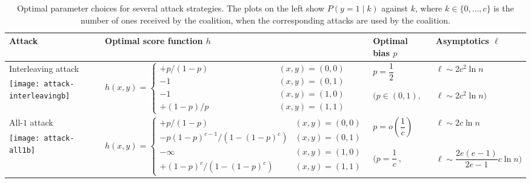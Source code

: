 \documentclass[10pt,a4paper,twocolumn]{article}
\begin{document}
\begin{table*}[t]
\centering

    \caption{Optimal parameter choices for several attack strategies. The plots on the left show $P(y = 1 \mid k)$ against $k$, where $k \in \{0, \dots, c\}$ is the number of ones received by the coalition, when the corresponding attacks are used by the coalition.}
    \label{tab:1}
\renewcommand{\arraystretch}{1.3}\begin{small}
    \begin{tabular}{p{2.8cm}p{8.2cm}p{2.2cm}p{3cm}}
    \toprule
    {\bfseries Attack} & {\bfseries Optimal score function $h$} & {\bfseries Optimal bias $p$} & {\bfseries Asymptotics $\ell$} \\ 
    \midrule
    Interleaving attack & \multirow{4}{*}{$h(x,y) = \begin{cases} 
	+p/(1 - p) \qquad \qquad \qquad \quad \	\	& (x,y) = (0,0) \\
	-1 											& (x,y) = (0,1) \\
	-1 											& (x,y) = (1,0) \\ 
	+(1 - p)/p									& (x,y) = (1,1) 
	\end{cases}$} & \multirow{2}{*}{$p = \dfrac{1}{2}$}  & \multirow{2}{*}{$\ell \sim 2 c^2 \ln n$} \\
    \multirow{3}{*}{\texttt{[image: attack-interleavingb]}}	& &	& \\
            & &	\multirow{2}{*}{$\Big(p \in (0,1),$} & \multirow{2}{*}{$\ell \sim 2 c^2 \ln n\Big)$} \\
            & & & \\
    \midrule
	All-$1$ attack & \multirow{4}{*}{$h(x,y) = \begin{cases} 
	+p/(1 - p) 									& (x,y) = (0,0) \\
	-p(1 - p)^{c - 1}/(1 - (1 - p)^c) 			& (x,y) = (0,1) \\
	-\infty 									& (x,y) = (1,0) \\ 
	+(1 - p)^c/(1 - (1 - p)^c)					& (x,y) = (1,1) 
	\end{cases}$} & \multirow{2}{*}{$p = o\left(\dfrac{1}{c}\right)$} & \multirow{2}{*}{$\ell \sim 2 c \ln n$} \\
	\multirow{3}{*}{\texttt{[image: attack-all1b]}}			& & & \\
& & \multirow{2}{*}{$\Big(p = \dfrac{1}{c}\, ,$} & \multirow{2}{*}{$\ell \sim \dfrac{2e(e-1)}{2e-1} c \ln n\Big)$} \\
			& & & \\

\end{tabular}
\end{small}
\end{table*}
\end{document}
